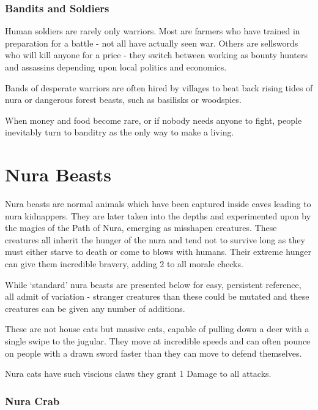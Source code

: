 \label{human_soldier}
\subsubsection{Bandits and Soldiers}
\humansoldier

Human soldiers are rarely only warriors.  Most are farmers who have trained in preparation for a battle - not all have actually seen war.  Others are sellswords who will kill anyone for a price - they switch between working as bounty hunters and assassins depending upon local politics and economics.

	Bands of desperate warriors are often hired by villages to beat back rising tides of nura or dangerous forest beasts, such as basilisks or woodspies.

When money and food become rare, or if nobody needs anyone to fight, people inevitably turn to banditry as the only way to make a living.

\section{Nura Beasts}

Nura beasts are normal animals which have been captured inside caves leading to nura kidnappers.  They are later taken into the depths and experimented upon by the magics of the Path of Nura, emerging as misshapen creatures.  These creatures all inherit the hunger of the nura and tend not to survive long as they must either starve to death or come to blows with humans.  Their extreme hunger can give them incredible bravery, adding 2 to all morale checks.

	While `standard' nura beasts are presented below for easy, persistent reference, all admit of variation - stranger creatures than these could be mutated and these creatures can be given any number of additions.

\label{nura_cat}
\nuracat

These are not house cats but massive cats, capable of pulling down a deer with a single swipe to the jugular.  They move at incredible speeds and can often pounce on people with a drawn sword faster than they can move to defend themselves.

Nura cats have such viscious claws they grant 1 Damage to all attacks.

\subsubsection{Nura Crab}\label{nura_crab}
\nuracrab

